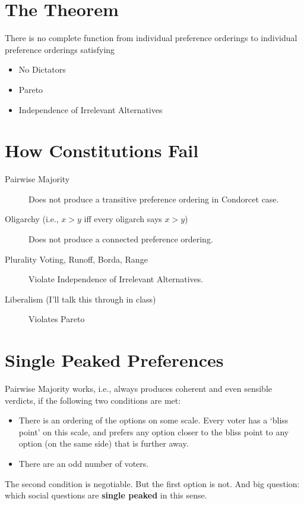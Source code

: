\section{The Theorem}
\label{thetheorem}

There is no complete function from individual preference orderings to individual preference orderings satisfying

\begin{itemize}
\item{} No Dictators

\item{} Pareto

\item{} Independence of Irrelevant Alternatives

\end{itemize}
\section{How Constitutions Fail}
\label{howconstitutionsfail}

\begin{description}
\item[Pairwise Majority]

Does not produce a transitive preference ordering in Condorcet case.

\item[Oligarchy (i.e., $x > y$ iff every oligarch says $x > y$)]

Does not produce a connected preference ordering.

\item[Plurality Voting, Runoff, Borda, Range]

Violate Independence of Irrelevant Alternatives.

\item[Liberalism (I'll talk this through in class)]

Violates Pareto
\end{description}
\section{Single Peaked Preferences}
\label{singlepeakedpreferences}

Pairwise Majority works, i.e., always produces coherent and even sensible verdicts, if the following two conditions are met:

\begin{itemize}
\item{} There is an ordering of the options on some scale. Every voter has a `bliss point' on this scale, and prefers any option closer to the bliss point to any option (on the same side) that is further away.

\item{} There are an odd number of voters.

\end{itemize}
The second condition is negotiable. But the first option is not. And big question: which social questions are \textbf{single peaked} in this sense.


